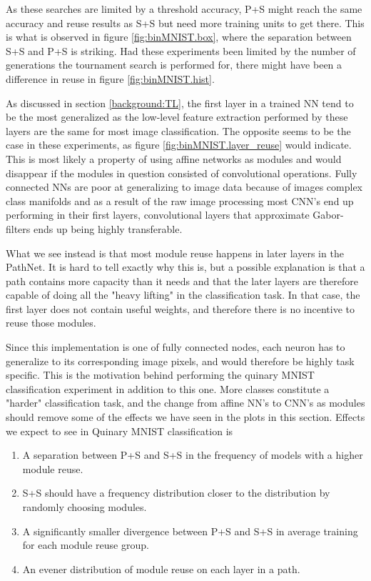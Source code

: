 As these searches are limited by a threshold accuracy, P+S might reach the same accuracy and reuse results as S+S but need more training units to get there. This is what is observed in figure \ref{fig:binMNIST.box}, where the separation between S+S and P+S is striking. Had these experiments been limited by the number of generations the tournament search is performed for, there might have been a difference in reuse in figure \ref{fig:binMNIST.hist}.

As discussed in section \ref{background:TL}, the first layer in a trained NN tend to be the most generalized as the low-level feature extraction performed by these layers are the same for most image classification. The opposite seems to be the case in these experiments, as figure \ref{fig:binMNIST.layer_reuse} would indicate. This is most likely a property of using affine networks as modules and would disappear if the modules in question consisted of convolutional operations. Fully connected NNs are poor at generalizing to image data because of images complex class manifolds and as a result of the raw image processing most CNN's end up performing in their first layers, convolutional layers that approximate Gabor-filters ends up being highly transferable\cite{yosinski2014transferable}.

What we see instead is that most module reuse happens in later layers in the PathNet. It is hard to tell exactly why this is, but a possible explanation is that a path contains more capacity than it needs and that the later layers are therefore capable of doing all the "heavy lifting" in the classification task. In that case, the first layer does not contain useful weights, and therefore there is no incentive to reuse those modules. 

Since this implementation is one of fully connected nodes, each neuron has to generalize to its corresponding image pixels, and would therefore be highly task specific. This is the motivation behind performing the quinary MNIST classification experiment in addition to this one. More classes constitute a "harder" classification task, and the change from affine NN's to CNN's as modules should remove some of the effects we have seen in the plots in this section. Effects we expect to see in Quinary MNIST classification is

\begin{enumerate}
    \item A separation between P+S and S+S in the frequency of models with a higher module reuse.
    \item S+S should have a frequency distribution closer to the distribution by randomly choosing modules.
    \item A significantly smaller divergence between P+S and S+S in average training for each module reuse group. 
    \item An evener distribution of module reuse on each layer in a path.
\end{enumerate}

